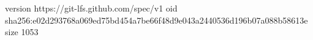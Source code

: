 version https://git-lfs.github.com/spec/v1
oid sha256:e02d293768a069ed75bd454a7be66f48d9e043a2440536d196b07a088b58613e
size 1053
